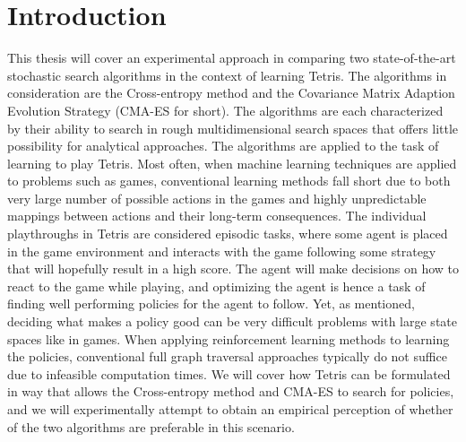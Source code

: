 \section{Introduction \label{sec:intro}}

This thesis will cover an experimental approach 
in comparing two state-of-the-art stochastic search
algorithms in the context of learning Tetris. 
The algorithms in consideration
are the Cross-entropy method and 
the Covariance Matrix Adaption Evolution Strategy (CMA-ES
for short). The algorithms are each characterized by their
ability to search in rough multidimensional 
search spaces that offers little possibility 
for analytical approaches.
The algorithms are applied to the task of learning to play Tetris. 
Most often, when machine learning
techniques are applied to problems such as games, conventional
learning methods fall short due to both  very large number of 
possible actions in the games and highly unpredictable mappings 
between actions and their long-term consequences. The individual playthroughs
in Tetris are considered episodic tasks, where some agent is placed
in the game environment and interacts with the game following some
strategy that will hopefully result in a high score. 
The agent will make decisions on how to react 
to the game while playing, and optimizing the agent is hence a task of
finding well performing policies for the agent to follow. Yet, as mentioned,
deciding what makes a policy good can be very difficult problems 
with large state spaces like in games. When applying reinforcement learning methods to learning
the policies, conventional full graph traversal approaches typically do not suffice 
due to infeasible computation times. We will cover how
Tetris can be formulated in way that allows  the Cross-entropy method 
and CMA-ES to search for policies, and we will experimentally 
attempt to obtain an empirical perception of whether of the two algorithms
are preferable in this scenario.







%


